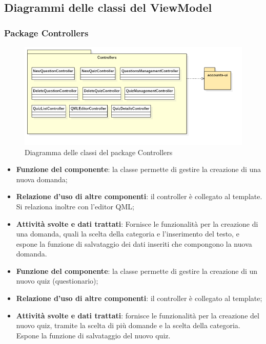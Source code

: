 \subsection{Diagrammi delle classi del ViewModel}
\subsubsection{Package Controllers}
\begin{figure}[h!]
	\begin{center}
		\includegraphics[scale=0.6]{../images/ControllersClass.png}
		\caption{Diagramma delle classi del package Controllers}
	\end{center}
\end{figure}


\begin{itemize}
	\item\textbf{Funzione del componente}: la classe permette di gestire la creazione di una nuova domanda;
	\item\textbf{Relazione d'uso di altre componenti}: il controller è collegato al template. Si relaziona inoltre con  l'editor QML;
	\item\textbf{Attività svolte e dati trattati}: Fornisce le funzionalità per la creazione di una domanda, quali la scelta della categoria e l'inserimento del testo, e espone la funzione di salvataggio dei dati inseriti che compongono la nuova domanda.
\end{itemize}


\begin{itemize}
	\item\textbf{Funzione del componente}: la classe permette di gestire la creazione di un nuovo quiz (questionario); 
	\item\textbf{Relazione d'uso di altre componenti}: il controller è collegato al template;
	\item\textbf{Attività svolte e dati trattati}: fornisce le funzionalità per la creazione del nuovo quiz, tramite la scelta di più domande e la scelta della categoria. Espone la funzione di salvataggio del nuovo quiz.
\end{itemize}

